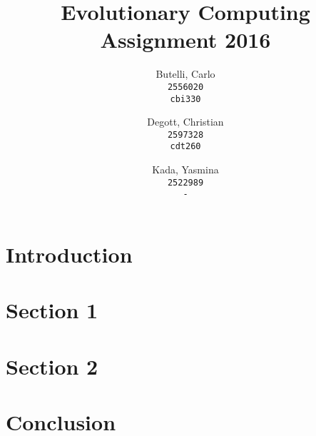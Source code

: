 \documentclass[runningheads,a4paper]{llncs}
\begin{document}
\mainmatter  %

\title{Evolutionary Computing\\Assignment 2016}

%
\author{
  Butelli, Carlo\\
  \texttt{2556020}\\
  \texttt{cbi330}
  \and
  Degott, Christian\\
  \texttt{2597328}\\
  \texttt{cdt260}
   \and
  Kada, Yasmina\\
  \texttt{2522989}\\
  \texttt{-}
}
%


%
%
\maketitle
\section{Introduction}
\cite{eiben2003introduction}

\section{Section 1}
 
\section{Section 2}

\section{Conclusion}

{}


\appendix

\end{document}
